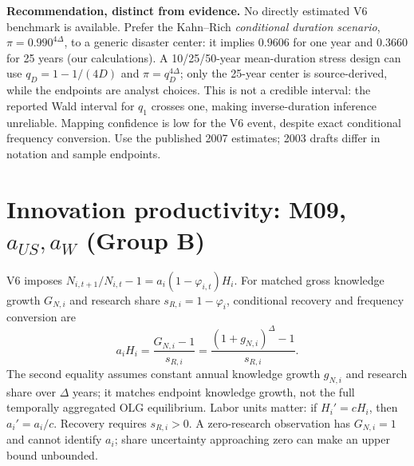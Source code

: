 \noindent\textbf{Recommendation, distinct from evidence.}
No directly estimated V6 benchmark is available. Prefer the Kahn--Rich
\emph{conditional duration scenario}, $\pi=0.990^{4\Delta}$, to a generic
disaster center: it implies $0.9606$ for one year and $0.3660$ for 25 years
(our calculations). A 10/25/50-year mean-duration stress design can use
$q_D=1-1/(4D)$ and $\pi=q_D^{4\Delta}$; only the 25-year center is
source-derived, while the endpoints are analyst choices. This is not a
credible interval: the reported Wald interval for $q_1$ crosses one, making
inverse-duration inference unreliable. Mapping confidence is low for the
V6 event, despite exact conditional frequency conversion. Use the published
2007 estimates; 2003 drafts differ in notation and sample endpoints.

\clearpage
\section{Innovation productivity: M09, $a_{US},a_W$ (Group B)}

V6 imposes $N_{i,t+1}/N_{i,t}-1=a_i(1-\varphi_{i,t})H_i$.
For matched gross knowledge growth $G_{N,i}$ and research share
$s_{R,i}=1-\varphi_i$, conditional recovery and frequency conversion are
\[
 a_iH_i=\frac{G_{N,i}-1}{s_{R,i}}
       =\frac{(1+g_{N,i})^\Delta-1}{s_{R,i}}.
\]
The second equality assumes constant annual knowledge growth $g_{N,i}$ and
research share over $\Delta$ years; it matches endpoint knowledge growth,
not the full temporally aggregated OLG equilibrium. Labor units matter:
if $H_i'=cH_i$, then $a_i'=a_i/c$.
Recovery requires $s_{R,i}>0$. A zero-research observation has $G_{N,i}=1$
and cannot identify $a_i$; share uncertainty approaching zero can make
an upper bound unbounded.

